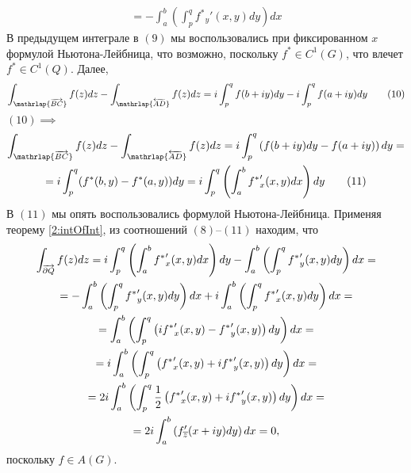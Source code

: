\documentclass[main]{subfiles}
\begin{document}
\begin{longProof}
\begin{multline*}
        = - \int_{a}^{b} \left( \int_{p}^{q} {f^*}_y' (x, y) dy\right) dx \tag{9}
    \end{multline*}
    В предыдущем интеграле в $(9)$ мы воспользовались при фиксированном $x$ формулой Ньютона-Лейбница, что возможно, поскольку $f^* \in C^1(G)$, что влечет $f^* \in C^1(Q)$.
    Далее,
    \[\AnClOrInt[\mathrlap{\AnClOrCurve[BC]}] f(z) dz - \ClOrInt[\mathrlap{\ClOrCurve[AD]}] f(z) dz = i \int_{p}^{q} f(b + iy) dy - i \int_{p}^{q} f(a + iy) dy \tag{10}\]
    $(10) \implies$
    \begin{multline*}
        \AnClOrInt[\mathrlap{\AnClOrCurve[BC]}] f(z) dz - \ClOrInt[\mathrlap{\ClOrCurve[AD]}] f(z) dz = i \int_{p}^{q} \left( f(b + iy) dy - f(a + iy) \right) dy = \\
        = i \int_{p}^{q} (f^*(b, y) - f^*(a, y)) dy = i \int_{p}^{q} \left( \int_{a}^{b} {f^*}_x' (x, y) dx\right) dy \tag{11}
    \end{multline*}
    В $(11)$ мы опять воспользовались формулой Ньютона-Лейбница.
    Применяя теорему \ref{2:intOfInt}, из соотношений $(8)$--$(11)$ находим, что
    \begin{multline*}
        \AnClOrInt[\AnClOrCurve[\partial Q]] f(z) dz = i \int_{p}^{q} \left( \int_{a}^{b} {f^*}_x' (x, y) dx\right) dy - \int_{a}^{b} \left( \int_{p}^{q} {f^*}_y' (x, y) dy\right) dx = \\
        = - \int_{a}^{b} \left( \int_{p}^{q} {f^*}_y' (x, y) dy\right) dx + i \int_{a}^{b} \left( \int_{p}^{q} {f^*}_x' (x, y) dy\right) dx = \\
        = \int_{a}^{b} \left( \int_{p}^{q} \left( i {f^*}_x' (x, y) - {f^*}_y'(x, y)\right) dy \right) dx = \\
        = i \int_{a}^{b} \left( \int_{p}^{q} \left( {f^*}_x' (x, y) + i {f^*}_y'(x, y)\right) dy \right) dx = \\
        = 2 i \int_{a}^{b} \left( \int_{p}^{q} \frac{1}{2} \left( {f^*}_x' (x, y) + i {f^*}_y'(x, y)\right) dy \right) dx = \\
        = 2 i \int_{a}^{b} \left( f_{\overline{z}}' (x + iy) dy\right) dx = 0,
    \end{multline*}
    поскольку $f \in A(G)$.
\end{longProof}
\end{document}
